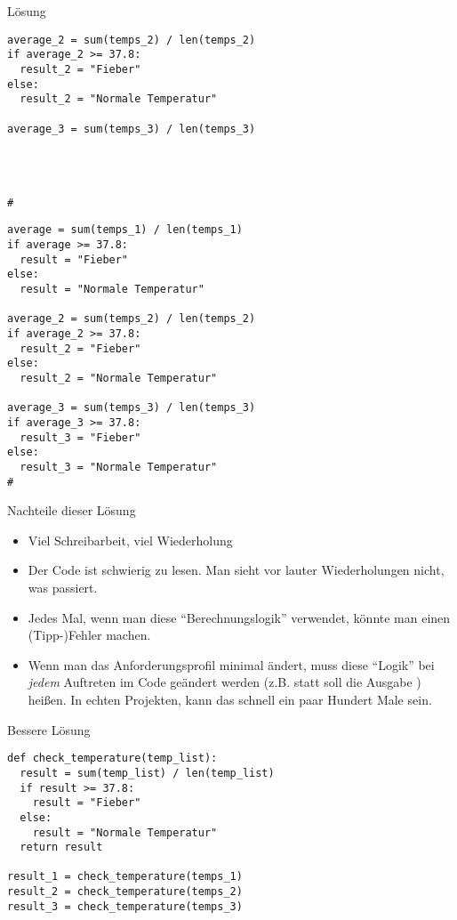 \begin{fragile}{}
\begin{block}{Lösung }
\begin{overprint}
\begin{verbatim}
average_2 = sum(temps_2) / len(temps_2)
if average_2 >= 37.8:
  result_2 = "Fieber"
else: 
  result_2 = "Normale Temperatur"

average_3 = sum(temps_3) / len(temps_3)




#
\end{verbatim}
\begin{verbatim}
average = sum(temps_1) / len(temps_1)
if average >= 37.8: 
  result = "Fieber"
else: 
  result = "Normale Temperatur"

average_2 = sum(temps_2) / len(temps_2)
if average_2 >= 37.8:
  result_2 = "Fieber"
else: 
  result_2 = "Normale Temperatur"

average_3 = sum(temps_3) / len(temps_3)
if average_3 >= 37.8:
  result_3 = "Fieber"
else: 
  result_3 = "Normale Temperatur"
#
\end{verbatim}
\end{overprint}
\end{block}
\end{fragile}

\begin{frame}
\begin{block}{Nachteile dieser Lösung}
	\pause 
	\begin{itemize}[<+->]
	\item Viel Schreibarbeit, viel Wiederholung
	\item Der Code ist schwierig zu lesen. Man sieht vor lauter Wiederholungen nicht, was passiert. 
	\item Jedes Mal, wenn man diese \enquote{Berechnungslogik} verwendet, könnte man einen (Tipp-)Fehler machen.  
	\item Wenn man das Anforderungsprofil minimal ändert, muss diese \enquote{Logik} bei \emph{jedem} Auftreten im Code geändert werden
		(z.B. statt  soll die Ausgabe ) heißen. In echten Projekten, kann das schnell ein paar Hundert Male sein. 	
	\end{itemize}
\end{block}
\end{frame}

\begin{fragile}
\begin{block}{Bessere Lösung}
\begin{verbatim}
def check_temperature(temp_list):
  result = sum(temp_list) / len(temp_list)
  if result >= 37.8:
    result = "Fieber"
  else: 
    result = "Normale Temperatur"
  return result

result_1 = check_temperature(temps_1)
result_2 = check_temperature(temps_2)
result_3 = check_temperature(temps_3)
\end{verbatim}
\end{block}

\end{fragile}


